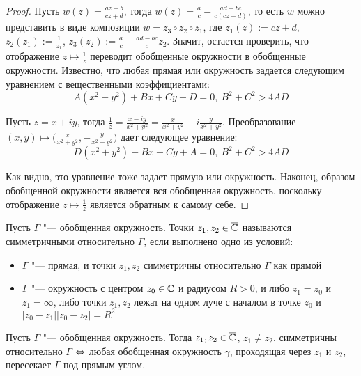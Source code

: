 \begin{proof}
	Пусть $w(z) = \frac{az + b}{cz + d}$, тогда $w(z) = \frac ac - \frac{ad - bc}{c(cz + d)}$, то есть $w$ можно представить в виде композиции $w = z_3 \circ z_2 \circ z_1$, где $z_1(z) := cz + d$, $z_2(z_1) := \frac 1{z_1}$, $z_3(z_2) := \frac ac - \frac{ ad - bc}c z_2$. Значит, остается проверить, что отображение $z \mapsto \frac 1z$ переводит обобщенные окружности в обобщенные окружности. Известно, что любая прямая или окружность задается следующим уравнением с вещественными коэффициентами:
	\[A(x^2 + y^2) + Bx + Cy + D = 0,~B^2 + C^2 > 4AD\]
	
	Пусть $z = x + iy$, тогда $\frac 1z = \frac{x - iy}{x^2 + y^2} = \frac{x}{x^2 + y^2} - i\frac{y}{x^2 + y^2}$. Преобразование $(x, y) \mapsto \big(\frac{x}{x^2 + y^2}, -\frac{y}{x^2 + y^2}\big)$ дает следующее уравнение:
	\[D(x^2 + y^2) + Bx - Cy + A = 0,~B^2 + C^2 > 4AD\]
	
	Как видно, это уравнение тоже задает прямую или окружность. Наконец, образом обобщенной окружности является вся обобщенная окружность, поскольку отображение $z \mapsto \frac 1z$ является обратным к самому себе.
\end{proof}

\begin{definition}
	Пусть $\Gamma$ "--- обобщенная окружность. Точки $z_1, z_2 \in \overline{\mathbb{C}}$ называются симметричными относительно $\Gamma$, если выполнено одно из условий:
	\begin{itemize}
		\item $\Gamma$ "--- прямая, и точки $z_1, z_2$ симметричны относительно $\Gamma$ как прямой
		\item $\Gamma$ "--- окружность с центром $z_0 \in \mathbb{C}$ и радиусом $R > 0$, и либо $z_1 = z_0$ и $z_1 = \infty$, либо точки $z_1, z_2$ лежат на одном луче с началом в точке $z_0$ и $|z_0 - z_1||z_0 - z_2| = R^2$
	\end{itemize}
\end{definition}

\begin{proposition}
	Пусть $\Gamma$ "--- обобщенная окружность. Тогда $z_1, z_2 \in \overline{\mathbb{C}}$, $z_1 \ne z_2$, симметричны относительно $\Gamma$ $\Leftrightarrow$ любая обобщенная окружность $\gamma$, проходящая через $z_1$ и $z_2$, пересекает $\Gamma$ под прямым углом.
\end{proposition}

